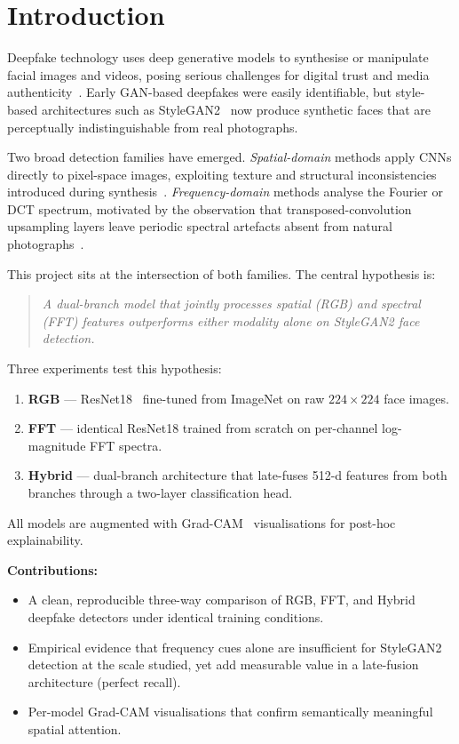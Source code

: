 \section{Introduction}
\label{sec:intro}

Deepfake technology uses deep generative models to synthesise or manipulate
facial images and videos, posing serious challenges for digital trust and
media authenticity~\cite{goodfellow2014gan}.
Early GAN-based deepfakes were easily identifiable, but style-based
architectures such as StyleGAN2~\cite{karras2020stylegan2} now produce
synthetic faces that are perceptually indistinguishable from real photographs.

Two broad detection families have emerged.
\emph{Spatial-domain} methods apply CNNs directly to pixel-space images,
exploiting texture and structural inconsistencies introduced during
synthesis~\cite{rossler2019faceforensics}.
\emph{Frequency-domain} methods analyse the Fourier or DCT spectrum,
motivated by the observation that transposed-convolution upsampling layers
leave periodic spectral artefacts absent from natural
photographs~\cite{frank2020frequency,dzanic2020fourier,durall2019unmasking}.

This project sits at the intersection of both families.
The central hypothesis is:
\begin{quote}
\emph{A dual-branch model that jointly processes spatial (RGB) and spectral
(FFT) features outperforms either modality alone on StyleGAN2 face
detection.}
\end{quote}

Three experiments test this hypothesis:
\begin{enumerate}
  \item \textbf{RGB} — ResNet18~\cite{he2016resnet} fine-tuned from
    ImageNet on raw $224\!\times\!224$ face images.
  \item \textbf{FFT} — identical ResNet18 trained from scratch on
    per-channel log-magnitude FFT spectra.
  \item \textbf{Hybrid} — dual-branch architecture that late-fuses 512-d
    features from both branches through a two-layer classification head.
\end{enumerate}

All models are augmented with Grad-CAM~\cite{selvaraju2017gradcam}
visualisations for post-hoc explainability.

\noindent\textbf{Contributions:}
\begin{itemize}
  \item A clean, reproducible three-way comparison of RGB, FFT, and Hybrid
    deepfake detectors under identical training conditions.
  \item Empirical evidence that frequency cues alone are insufficient for
    StyleGAN2 detection at the scale studied, yet add measurable value in a
    late-fusion architecture (perfect recall).
  \item Per-model Grad-CAM visualisations that confirm semantically
    meaningful spatial attention.
\end{itemize}
